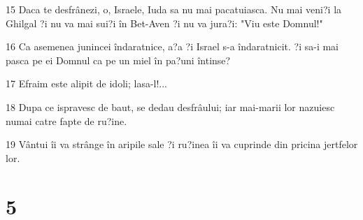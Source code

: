 \par 15 Daca te desfrânezi, o, Israele, Iuda sa nu mai pacatuiasca. Nu mai veni?i la Ghilgal ?i nu va mai sui?i în Bet-Aven ?i nu va jura?i: "Viu este Domnul!"
\par 16 Ca asemenea junincei îndaratnice, a?a ?i Israel s-a îndaratnicit. ?i sa-i mai pasca pe ei Domnul ca pe un miel în pa?uni întinse?
\par 17 Efraim este alipit de idoli; lasa-l!...
\par 18 Dupa ce ispravesc de baut, se dedau desfrâului; iar mai-marii lor nazuiesc numai catre fapte de ru?ine.
\par 19 Vântui îi va strânge în aripile sale ?i ru?inea îi va cuprinde din pricina jertfelor lor.

\chapter{5}

